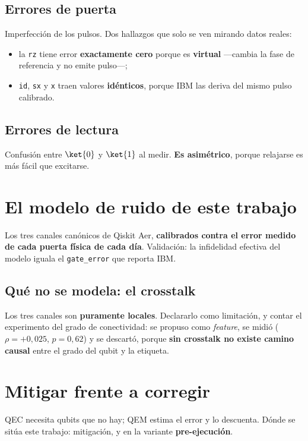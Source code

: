 \subsection{Errores de puerta}
Imperfección de los pulsos. Dos hallazgos que solo se ven mirando datos reales:
\begin{itemize}
    \item la \texttt{rz} tiene error \textbf{exactamente cero} porque es \textbf{virtual}
          —cambia la fase de referencia y no emite pulso—;
    \item \texttt{id}, \texttt{sx} y \texttt{x} traen valores \textbf{idénticos}, porque IBM
          las deriva del mismo pulso calibrado.
\end{itemize}

\subsection{Errores de lectura}
Confusión entre $\ket{0}$ y $\ket{1}$ al medir. \textbf{Es asimétrico}, porque relajarse es
más fácil que excitarse.

\section{El modelo de ruido de este trabajo}
\label{sec:modelo_ruido}
Los tres canales canónicos de Qiskit Aer, \textbf{calibrados contra el error medido de cada
puerta física de cada día}. Validación: la infidelidad efectiva del modelo iguala el
\texttt{gate\_error} que reporta IBM.

\subsection{Qué no se modela: el crosstalk}
Los tres canales son \textbf{puramente locales}. Declararlo como limitación, y contar el
experimento del grado de conectividad: se propuso como \textit{feature}, se midió
($\rho = +0{,}025$, $p = 0{,}62$) y se descartó, porque \textbf{sin crosstalk no existe camino
causal} entre el grado del qubit y la etiqueta.

\section{Mitigar frente a corregir}
\label{sec:qem_vs_qec}
QEC necesita qubits que no hay; QEM estima el error y lo descuenta. Dónde se sitúa este
trabajo: mitigación, y en la variante \textbf{pre-ejecución}.
